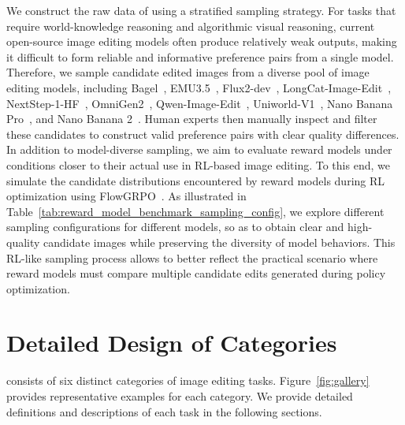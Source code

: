 We construct the raw data of {\rmbench} using a stratified sampling strategy. For tasks that require world-knowledge reasoning and algorithmic visual reasoning, current open-source image editing models often produce relatively weak outputs, making it difficult to form reliable and informative preference pairs from a single model. Therefore, we sample candidate edited images from a diverse pool of image editing models, including Bagel~\cite{deng2025emerging}, EMU3.5~\cite{cui2025emu3}, Flux2-dev~\cite{flux-2-2025}, LongCat-Image-Edit~\cite{team2025longcat}, NextStep-1-HF~\cite{han2025nextstep}, OmniGen2~\cite{wu2025omnigen2}, Qwen-Image-Edit~\cite{wu2025qwen}, Uniworld-V1~\cite{lin2025uniworld}, Nano Banana Pro~\cite{nanobananapro}, and Nano Banana 2~\cite{google2026gemini31propreview}. Human experts then manually inspect and filter these candidates to construct valid preference pairs with clear quality differences.
In addition to model-diverse sampling, we aim to evaluate reward models under conditions closer to their actual use in RL-based image editing. To this end, we simulate the candidate distributions encountered by reward models during RL optimization using FlowGRPO~\cite{liu2025flow}. As illustrated in Table~\ref{tab:reward_model_benchmark_sampling_config}, we explore different sampling configurations for different models, so as to obtain clear and high-quality candidate images while preserving the diversity of model behaviors. This RL-like sampling process allows {\rmbench} to better reflect the practical scenario where reward models must compare multiple candidate edits generated during policy optimization.

\section{Detailed Design of {\bench} Categories}
{\bench} consists of six distinct categories of image editing tasks. Figure~\ref{fig:gallery} provides representative examples for each category. We provide detailed definitions and descriptions of each task in the following sections.

